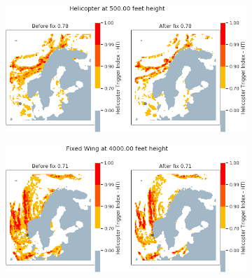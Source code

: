 \begin{figure}[H]
    \begin{subfigure}{0.45\textwidth}
    \centering
    \includegraphics[width=\textwidth]{Figures/16.png}
    \caption{}
    \label{fig:HTI16}
    \end{subfigure}
\hfill
    \begin{subfigure}{0.45\textwidth}
    \centering
    \includegraphics[width=\textwidth]{Figures/17.png}
    \caption{}
    \label{fig:HTI17}
    \end{subfigure}


\end{figure}
